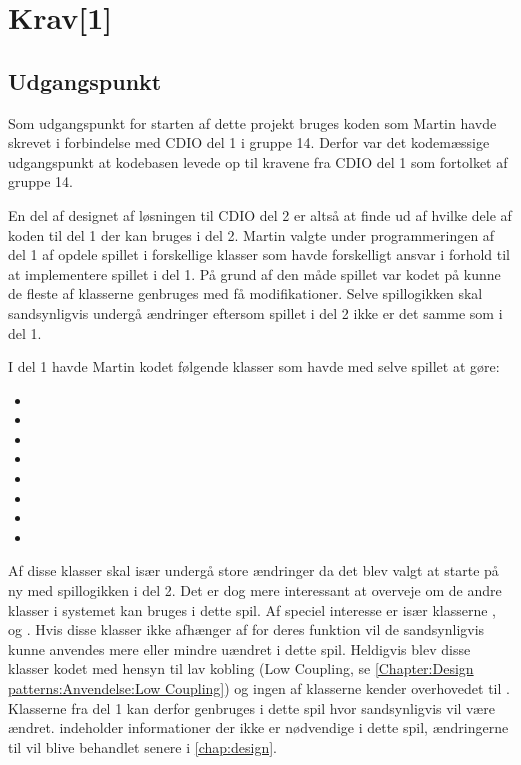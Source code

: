 \chapter{Krav[1]}\label{chap:krav}

\section{Udgangspunkt}\label{sec:krav:kravUdgangspunkt}
Som udgangspunkt for starten af dette projekt bruges koden som Martin havde skrevet i forbindelse med CDIO del 1 i gruppe 14. Derfor var det kodemæssige udgangspunkt at kodebasen levede op til kravene fra CDIO del 1 som fortolket af gruppe 14.

En del af designet af løsningen til CDIO del 2 er altså at finde ud af hvilke dele af koden til del 1 der kan bruges i del 2. Martin valgte under programmeringen af del 1 af opdele spillet i forskellige klasser som havde forskelligt ansvar i forhold til at implementere spillet i del 1. På grund af den måde spillet var kodet på kunne de fleste af klasserne genbruges med få modifikationer. Selve spillogikken skal sandsynligvis undergå ændringer eftersom spillet i del 2 ikke er det samme som i del 1.

I del 1 havde Martin kodet følgende klasser som havde med selve spillet at gøre:
\begin{itemize}
\item {}
\item {}
\item {}
\item {}
\item {}
\item {}
\item {}
\item {}
\end{itemize}

Af disse klasser skal især  undergå store ændringer da det blev valgt at starte på ny med spillogikken i del 2. Det er dog mere interessant at overveje om de andre klasser i systemet kan bruges i dette spil. Af speciel interesse er især klasserne ,  og . Hvis disse klasser ikke afhænger af  for deres funktion vil de sandsynligvis kunne anvendes mere eller mindre uændret i dette spil. Heldigvis blev disse klasser kodet med hensyn til lav kobling (Low Coupling, se \vref{Chapter:Design patterns:Anvendelse:Low Coupling}) og ingen af klasserne kender overhovedet til . Klasserne fra del 1 kan derfor genbruges i dette spil hvor  sandsynligvis vil være ændret.  indeholder informationer der ikke er nødvendige i dette spil, ændringerne til  vil blive behandlet senere i \vref{chap:design}.

